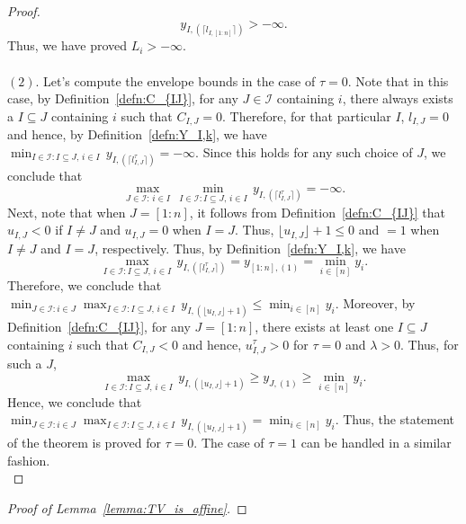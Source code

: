\documentclass[11pt]{article}
\newcommand{\I}{\mathcal{I}}
\newcommand{\cI}{\mathcal{I}}
\theoremstyle{plain}
\theoremstyle{definition}
\theoremstyle{remark}
\begin{document}
\begin{appendix}
\begin{proof}
 \[ y_{I,(\lceil l_{I,[1:n]}\rceil)}>-\infty.\]
 Thus, we have proved $L_i>-\infty.$\\
\\
\noindent $(2).$ Let's compute the envelope bounds in the case of $\tau=0$. Note that in this case, by Definition~\ref{defn:C_{IJ}}, for any $J \in \cI$ containing $i$, there always exists a $I\subseteq J$ containing $i$ such that $C_{I,J}=0$. Therefore, for that particular $I$, $l_{I,J}=0$ and hence, by Definition~\ref{defn:Y_I,k}, we have \(\min_{I\in \I: I\subseteq J,\, i \in I}\,y_{I,(\lceil l^{\tau}_{I,J}\rceil)}=-\infty.\) Since this holds for any such choice of $J$, we conclude that
\[\max_{J\in \I: \, i \in I}\,\min_{I\in \I: I\subseteq J,\, i \in I}\,y_{I,(\lceil l^{\tau}_{I,J}\rceil)}=-\infty.\]
Next, note that when $J=[1:n]$, it follows from Definition~\ref{defn:C_{IJ}} that $u_{I,J}<0$ if $I\neq J$ and $u_{I,J}=0$ when $I=J$. Thus, $\lfloor u_{I,J}\rfloor+1\leq 0$ and $=1$ when $I\neq J$ and $I=J$, respectively. Thus, by Definition~\ref{defn:Y_I,k}, we have
\[\max_{I\in \I: I\subseteq J,\, i \in I}\,y_{I,(\lceil l^{\tau}_{I,J}\rceil)}=y_{[1:n],(1)}=\min_{i \in [n]}y_i.\]
Therefore, we conclude that $\min_{J\in \I: i \in J}\max_{I\in \I: I\subseteq J,\, i \in I}\, y_{I,(\lfloor u_{I,J}\rfloor+1)}\leq \min_{i \in [n]}y_i$. Moreover, by Definition~\ref{defn:C_{IJ}}, for any $J=[1:n]$, there exists at least one $I\subseteq J$ containing $i$ such that $C_{I,J}<0$ and hence, $u^{\tau}_{I,J}>0$ for $\tau=0$ and $\lambda>0$.  Thus, for such a $J$,
\[\max_{I\in \I: I\subseteq J,\, i \in I}\, y_{I,(\lfloor u_{I,J}\rfloor+1)}\geq y_{J,(1)}\geq \min_{i\in [n]}y_i.\]
Hence, we conclude that $\min_{J\in \I: i \in J}\max_{I\in \I: I\subseteq J,\, i \in I}\, y_{I,(\lfloor u_{I,J}\rfloor+1)}=\min_{i \in [n]}y_i.$ Thus, the statement of the theorem is proved for $\tau=0$. The case of $\tau=1$ can be handled in a similar fashion.\\
\end{proof}

\begin{proof}[Proof of Lemma~\ref{lemma:TV_is_affine}]


\end{proof}
\end{appendix}
\end{document}
